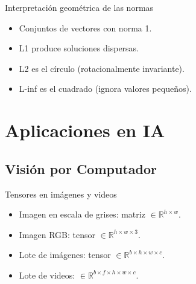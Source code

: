 \documentclass[aspectratio=169, 10pt, xcolor=table]{beamer}
\begin{document}
\begin{frame}{Interpretación geométrica de las normas}
    \begin{center}
    \end{center}
    \begin{itemize}
        \item Conjuntos de vectores con norma 1.
        \item L1 produce soluciones dispersas.
        \item L2 es el círculo (rotacionalmente invariante).
        \item L-inf es el cuadrado (ignora valores pequeños).
    \end{itemize}
\end{frame}

\section{Aplicaciones en IA}

\subsection{Visión por Computador}

\begin{frame}{Tensores en imágenes y videos}
    \begin{itemize}
        \item Imagen en escala de grises: matriz $\in \mathbb{R}^{h \times w}$.
        \item Imagen RGB: tensor $\in \mathbb{R}^{h \times w \times 3}$.
        \item Lote de imágenes: tensor $\in \mathbb{R}^{b \times h \times w \times c}$.
        \item Lote de videos: $\in \mathbb{R}^{b \times f \times h \times w \times c}$.
    \end{itemize}
\end{frame}
\end{document}
